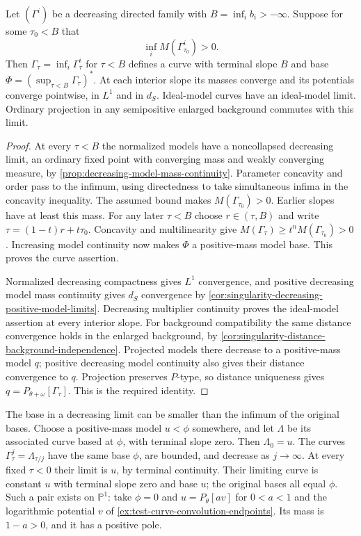 \begin{theorem}\label{thm:test-curve-decreasing-limits}
Let $(\Gamma^i)$ be a decreasing directed family with
$B=\inf_i b_i> -\infty$. Suppose for some $\tau_0<B$ that
\[
                  \inf_i M(\Gamma^i_{\tau_0})>0.
\]
Then $\Gamma_\tau=\inf_i\Gamma^i_\tau$ for $\tau<B$ defines a curve with terminal slope $B$ and base
$\Phi=(\sup_{\tau<B}\Gamma_\tau)^*$.
At each interior slope its masses converge and its potentials converge pointwise, in $L^1$ and in $d_S$. Ideal-model curves have an ideal-model limit. Ordinary projection in any semipositive enlarged background commutes with this limit.
\end{theorem}
\begin{proof}
At every $\tau<B$ the normalized models have a noncollapsed decreasing limit, an ordinary fixed point with converging mass and weakly converging measure, by \cref{prop:decreasing-model-mass-continuity}. Parameter concavity and order pass to the infimum, using directedness to take simultaneous infima in the concavity inequality. The assumed bound makes $M(\Gamma_{\tau_0})>0$. Earlier slopes have at least this mass. For any later $\tau<B$ choose $r\in(\tau,B)$ and write $\tau=(1-t)r+t\tau_0$. Concavity and multilinearity give $M(\Gamma_\tau)\geq t^nM(\Gamma_{\tau_0})>0$. Increasing model continuity now makes $\Phi$ a positive-mass model base. This proves the curve assertion.

Normalized decreasing compactness gives $L^1$ convergence, and positive decreasing model mass continuity gives $d_S$ convergence by \cref{cor:singularity-decreasing-positive-model-limits}. Decreasing multiplier continuity proves the ideal-model assertion at every interior slope. For background compatibility the same distance convergence holds in the enlarged background, by \cref{cor:singularity-distance-background-independence}. Projected models there decrease to a positive-mass model $q$; positive decreasing model continuity also gives their distance convergence to $q$. Projection preserves $P$-type, so distance uniqueness gives $q=P_{\theta+\omega}[\Gamma_\tau]$. This is the required identity.
\end{proof}

\begin{example}\label{ex:test-curve-limit-changing-base}
The base in a decreasing limit can be smaller than the infimum of the original bases. Choose a positive-mass model $u<\phi$ somewhere, and let $\Lambda$ be its associated curve based at $\phi$, with terminal slope zero. Then $\Lambda_0=u$. The curves
$\Gamma^j_\tau=\Lambda_{\tau/j}$ have the same base $\phi$, are bounded, and decrease as $j\to\infty$. At every fixed $\tau<0$ their limit is $u$, by terminal continuity. Their limiting curve is constant $u$ with terminal slope zero and base $u$; the original bases all equal $\phi$. Such a pair exists on $\mathbb P^1$: take $\phi=0$ and $u=P_\theta[av]$ for $0<a<1$ and the logarithmic potential $v$ of \cref{ex:test-curve-convolution-endpoints}. Its mass is $1-a>0$, and it has a positive pole.
\end{example}

